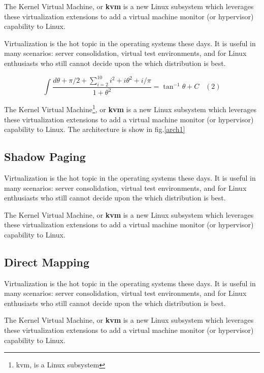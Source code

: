 \documentclass[a4paper,twocolumn,10pt]{article}
\begin{document}
  
  \noindent The Kernel Virtual Machine, or \textbf{kvm} is a new Linux
  subsystem which leverages these virtualization extensions
  to add a virtual machine monitor (or hypervisor) capability to Linux.
 
  \noindent Virtualization is the  hot topic in the operating systems 
  these days. It is useful in many scenarios: server consolidation,
  virtual test environments, and for Linux enthusiasts who
  still cannot decide upon the which distribution is best.
  
 \begin{displaymath}\int\frac{d\theta + \pi/2 + \sum \limits_{i=2}^{10} i^2 + i\theta ^2 + i/\pi }{1+\theta^2}=\tan^{-1} \theta + C \hspace{10pt}(2)
  \end{displaymath}

 

  
  \noindent The Kernel Virtual Machine\footnote{kvm, is a Linux subsystem}, or \textbf{kvm} is a new Linux
  subsystem which leverages these virtualization extensions
  to add a virtual machine monitor (or hypervisor) capability to Linux. The architecture is show in fig.\ref{arch1}

   \subsection{Shadow Paging}
    \noindent Virtualization is \newline the hot topic in the operating systems 
  these days. It is useful in many scenarios: server consolidation,
  virtual test environments, and for Linux enthusiasts who
  still cannot decide upon the which distribution is best.
  
  \noindent The Kernel Virtual Machine, or \textbf{kvm} is a new Linux
  subsystem which leverages these virtualization extensions
  to add a virtual machine monitor (or hypervisor) capability to Linux.
   
   \subsection{Direct Mapping}
   
    \noindent Virtualization is the hot topic in the operating systems 
  these days. It is useful in many scenarios: server consolidation,
  virtual test environments, and for Linux enthusiasts who
  still cannot decide upon the which distribution\cite{troy1} is best.
    
  \noindent The Kernel Virtual Machine, or \textbf{kvm} is a new Linux
  subsystem which leverages these virtualization extensions
  to add a virtual machine monitor (or hypervisor) capability to Linux.
   
\end{document}
